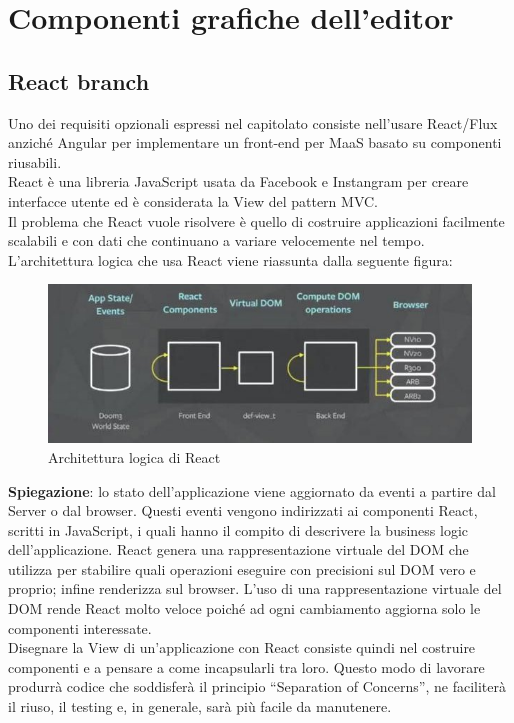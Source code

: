 \section{Componenti grafiche dell'editor}
\subsection{React branch}
Uno dei requisiti opzionali espressi nel capitolato consiste nell'usare React/Flux anziché Angular per implementare un front-end per MaaS basato su componenti riusabili.\\
React è una libreria JavaScript usata da Facebook e Instangram per creare interfacce utente ed è considerata la View del pattern MVC.\\
Il problema che React vuole risolvere è quello di costruire applicazioni facilmente scalabili e con dati che continuano a variare velocemente nel tempo.\\ 
L'architettura logica che usa React viene riassunta dalla seguente figura:
\begin{figure}[H]
  \centering
  \includegraphics[width=.8\textwidth]{res/img/react.png}
  \caption{Architettura logica di React}
  \label{fig:salvataggio}
\end{figure}
\textbf{Spiegazione}: lo stato dell'applicazione viene aggiornato da eventi a partire dal Server o dal browser. Questi eventi vengono indirizzati ai componenti React, scritti in JavaScript, i quali hanno il compito di descrivere la business logic dell'applicazione. React genera una rappresentazione virtuale del DOM che utilizza per stabilire quali operazioni eseguire con precisioni sul DOM vero e proprio; infine renderizza sul browser. L'uso di una rappresentazione virtuale del DOM rende React molto veloce poiché ad ogni cambiamento aggiorna solo le componenti interessate.\\
Disegnare la View di un'applicazione con React consiste quindi nel costruire componenti e a pensare a come incapsularli tra loro. Questo modo di lavorare produrrà codice che soddisferà il principio ``Separation of Concerns'', ne faciliterà il riuso, il testing e, in generale, sarà più facile da manutenere.
